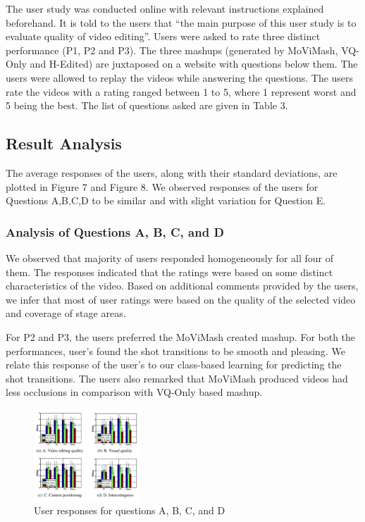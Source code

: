 \documentclass{sig-alternate}
\begin{document}
The user study was conducted online with relevant instructions
explained beforehand. It is told to the users that “the main purpose
of this user study is to evaluate quality of video editing”. Users
were asked to rate three distinct performance (P1, P2 and P3). The
three mashups (generated by MoViMash, VQ-Only and H-Edited)
are juxtaposed on a website with questions below them. The users were allowed to replay the videos while answering the questions.
The users rate the videos with a rating ranged between 1 to 5, where
1 represent worst and 5 being the best. The list of questions asked
are given in Table 3.

\subsection{Result Analysis}
The average responses of the users, along with their standard
deviations, are plotted in Figure 7 and Figure 8. We observed responses of the users for Questions A,B,C,D to be similar and with
slight variation for Question E.

\subsubsection{Analysis of Questions A, B, C, and D}
We observed that majority of users responded homogeneously
for all four of them. The responses indicated that the ratings were
based on some distinct characteristics of the video. Based on additional comments provided by the users, we infer that most of user
ratings were based on the quality of the selected video and coverage
of stage areas.

For P2 and P3, the users preferred the MoViMash created mashup.
For both the performances, user’s found the shot transitions to be
smooth and pleasing. We relate this response of the user’s to our
class-based learning for predicting the shot transitions. The users
also remarked that MoViMash produced videos had less occlusions
in comparison with VQ-Only based mashup.

\begin{figure}[htp]
\centering
\includegraphics[width = 4cm]{images/img7.png}
\caption{User responses for questions A, B, C, and D}
\end{figure}
\end{document}
